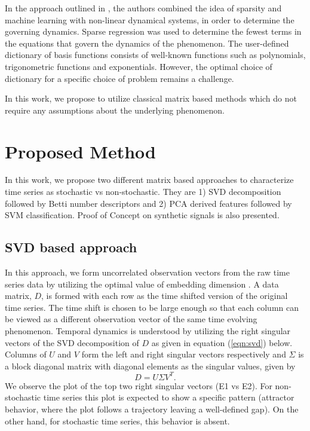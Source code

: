 \documentclass[journal]{IEEEtran}
\begin{document}
In the approach outlined in \cite{Brunton2016}, the authors combined the idea of sparsity and machine learning with non-linear dynamical systems, in order to determine the governing dynamics. Sparse regression was used to determine the fewest terms in the equations that govern the dynamics of the phenomenon. The user-defined dictionary of basis functions consists of well-known functions such as polynomials, trigonometric functions and exponentials. However, the optimal choice of dictionary for a specific choice of problem remains a challenge.

In this work, we propose to utilize classical matrix based methods which do not require any assumptions about the underlying phenomenon.

\section{Proposed Method}

In this work, we propose two different  matrix based approaches to characterize time series as stochastic vs non-stochastic. They are 1) SVD decomposition followed by  Betti number descriptors and 2) PCA derived features followed by SVM classification. Proof of Concept on synthetic signals is also presented.

\subsection{SVD based approach}
In this approach, we form uncorrelated observation vectors from the raw time series data by utilizing the optimal value of embedding dimension \cite{misra2006}. A data matrix, $D$, is formed with each row  as the  time shifted version of the original time series. The time shift is chosen to be large enough so that each column can be viewed as a different observation vector of the same time evolving phenomenon. Temporal dynamics is understood by utilizing the right singular vectors of the SVD decomposition of $D$ as given in equation (\ref{eqn:svd}) below. Columns of $U$ and $V$  form the left and right singular vectors respectively and $\Sigma$ is a block diagonal matrix with diagonal elements as the singular values, given by
\begin{equation}
D = U \Sigma V^T.
\label{eqn:svd}
\end{equation}
We observe the plot of the top two right singular vectors (E1 vs E2). For non-stochastic time series this plot is expected to show a specific pattern (attractor behavior, where the plot follows a trajectory leaving a well-defined gap). On the other hand, for stochastic time series, this behavior is absent.
\end{document}
